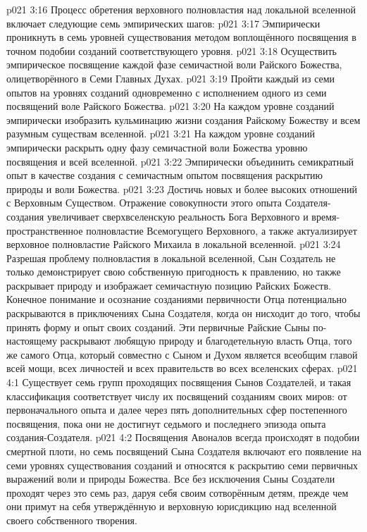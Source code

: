 \vs p021 3:16 \pc Процесс обретения верховного полновластия над локальной вселенной включает следующие семь эмпирических шагов:
\vs p021 3:17 Эмпирически проникнуть в семь уровней существования методом воплощённого посвящения в точном подобии созданий соответствующего уровня.
\vs p021 3:18 Осуществить эмпирическое посвящение каждой фазе семичастной воли Райского Божества, олицетворённого в Семи Главных Духах.
\vs p021 3:19 Пройти каждый из семи опытов на уровнях созданий одновременно с исполнением одного из семи посвящений воле Райского Божества.
\vs p021 3:20 На каждом уровне созданий эмпирически изобразить кульминацию жизни создания Райскому Божеству и всем разумным существам вселенной.
\vs p021 3:21 На каждом уровне созданий эмпирически раскрыть одну фазу семичастной воли Божества уровню посвящения и всей вселенной.
\vs p021 3:22 Эмпирически объединить семикратный опыт в качестве создания с семичастным опытом посвящения раскрытию природы и воли Божества.
\vs p021 3:23 Достичь новых и более высоких отношений с Верховным Существом. Отражение совокупности этого опыта Создателя\hyp{}создания увеличивает сверхвселенскую реальность Бога Верховного и время\hyp{}пространственное полновластие Всемогущего Верховного, а также актуализирует верховное полновластие Райского Михаила в локальной вселенной.
\vs p021 3:24 \pc Разрешая проблему полновластия в локальной вселенной, Сын Создатель не только демонстрирует свою собственную пригодность к правлению, но также раскрывает природу и изображает семичастную позицию Райских Божеств. Конечное понимание и осознание созданиями первичности Отца потенциально раскрываются в приключениях Сына Создателя, когда он нисходит до того, чтобы принять форму и опыт своих созданий. Эти первичные Райские Сыны по\hyp{}настоящему раскрывают любящую природу и благодетельную власть Отца, того же самого Отца, который совместно с Сыном и Духом является всеобщим главой всей мощи, всех личностей и всех правительств во всех вселенских сферах.
\vs p021 4:1 Существует семь групп проходящих посвящения Сынов Создателей, и такая классификация соответствует числу их посвящений созданиям своих миров: от первоначального опыта и далее через пять дополнительных сфер постепенного посвящения, пока они не достигнут седьмого и последнего эпизода опыта создания\hyp{}Создателя.
\vs p021 4:2 Посвящения Авоналов всегда происходят в подобии смертной плоти, но семь посвящений Сына Создателя включают его появление на семи уровнях существования созданий и относятся к раскрытию семи первичных выражений воли и природы Божества. Все без исключения Сыны Создатели проходят через это семь раз, даруя себя своим сотворённым детям, прежде чем они примут на себя утверждённую и верховную юрисдикцию над вселенной своего собственного творения.
